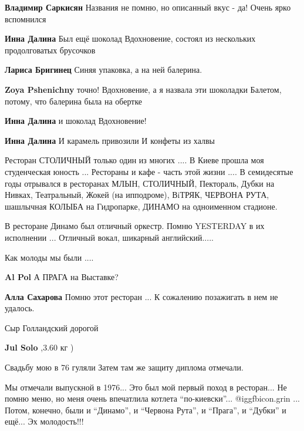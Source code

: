 \begin{itemize}
\begin{itemize}
\begin{itemize}
\textbf{Владимир Саркисян} Названия не помню, но описанный вкус - да! Очень ярко вспомнился
\end{itemize} %

\textbf{Инна Далина} Был ещё шоколад Вдохновение, состоял из нескольких продолговатых брусочков

\begin{itemize} %
\textbf{Лариса Бригинец} Синяя упаковка, а на ней балерина.

\textbf{Zoya Pshenichny} точно! Вдохновение, а я назвала эти шоколадки Балетом, потому, что балерина была на обертке
\end{itemize} %

\textbf{Инна Далина} и шоколад Вдохновение!

\textbf{Инна Далина}
И карамель привозили
И конфеты из халвы

\end{itemize} %


Ресторан СТОЛИЧНЫЙ только один из многих .... В Киеве прошла моя студенческая
юность ... Рестораны и кафе - часть этой жизни .... В семидесятые годы
отрывался в ресторанах МЛЫН, СТОЛИЧНЫЙ, Пектораль, Дубки на Нивках,
Театральный, Жокей (на ипподроме), ВiТРЯК, ЧЕРВОНА РУТА, шашлычная КОЛЫБА на
Гидропарке, ДИНАМО на одноименном стадионе.

В ресторане Динамо был отличный оркестр. Помню YESTERDAY в их исполнении ...
Отличный вокал, шикарный английский.....

Как молоды мы были ....

\begin{itemize} %
\textbf{Al Pol} А ПРАГА на Выставке?

\textbf{Алла Сахарова} Помню этот ресторан ... К сожалению позажигать в нем не удалось.
\end{itemize} %

Сыр Голландский дорогой

\textbf{Jul Solo} ,3.60 кг )

Свадьбу мою в 76 гуляли
Затем там же защиту диплома отмечали.


Мы отмечали выпускной в 1976... Это был мой первый поход в ресторан... Не помню
меню, но меня очень впечатлила котлета \enquote{по-киевски}...  @igg{fbicon.grin} ... Потом, конечно,
были и \enquote{Динамо}, и \enquote{Червона Рута}, и \enquote{Прага}, и \enquote{Дубки} и ещё... Эх
молодость!!!


\end{itemize}
